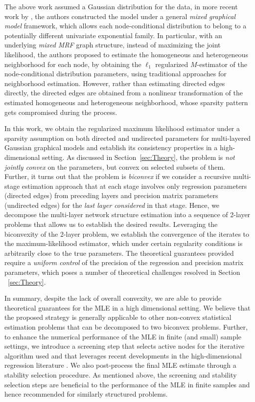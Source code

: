 The above work assumed a Gaussian distribution for the data, in
more recent work by \citet{yang2014mixed}, the authors constructed the model under a general {\em mixed graphical model} framework, which allows each node-conditional distribution to belong to a potentially different univariate exponential family. In particular, with an underlying {\em mixed MRF} graph structure, instead of maximizing the joint likelihood, the authors proposed to estimate the homogeneous and heterogeneous neighborhood for each node, by obtaining the $\ell_1$ regularized $M$-estimator of the node-conditional distribution parameters, using traditional approaches \citep[e.g.][]{meinshausen2006high} for neighborhood estimation. However, rather than estimating directed edges directly, the directed edges are obtained from a nonlinear transformation of the estimated homogeneous and heterogeneous neighborhood, whose sparsity pattern gets compromised during the process. 

In this work, we obtain the regularized maximum likelihood estimator under a sparsity assumption on both directed and undirected parameters for multi-layered Gaussian graphical models and establish its consistency properties in a high-dimensional setting. 
As discussed in Section~\ref{sec:Theory}, the problem is {\em not jointly convex} on the parameters, but convex on selected subsets of them. Further, it turns out that the problem is {\em biconvex} if
we consider a recursive multi-stage estimation approach that at each stage involves only regression parameters (directed edges) from preceding layers and precision matrix parameters (undirected edges) for the {\em last layer considered} in that stage. Hence, we decompose the multi-layer network structure estimation into a sequence of 2-layer problems that allows us to establish the desired results.
Leveraging the biconvexity of the 2-layer problem, we establish the convergence of the iterates to the maximum-likelihood estimator, which under certain regularity conditions is arbitrarily close to the true parameters. The theoretical guarantees provided require a {\em uniform control} of the precision of the
regression and precision matrix parameters, which poses a number of theoretical challenges resolved in Section ~\ref{sec:Theory}.


In summary, despite the lack of overall convexity, we are able
to provide theoretical guarantees for the MLE in a high dimensional setting. 
We believe that the proposed strategy is generally applicable
to other non-convex statistical estimation problems that can be decomposed to two biconvex problems. Further, to enhance the numerical performance of the MLE in finite (and small) sample settings, we introduce a screening step that selects active nodes for the iterative algorithm used and that leverages recent developments in the high-dimensional regression literature \citep[e.g.,][]{van2014asymptotically,javanmard2014confidence,zhang2014confidence}. We also post-process the final MLE estimate through a stability selection procedure. As mentioned above, the screening and stability selection steps are beneficial to the performance of the MLE in finite samples and hence recommended for similarly structured problems.

